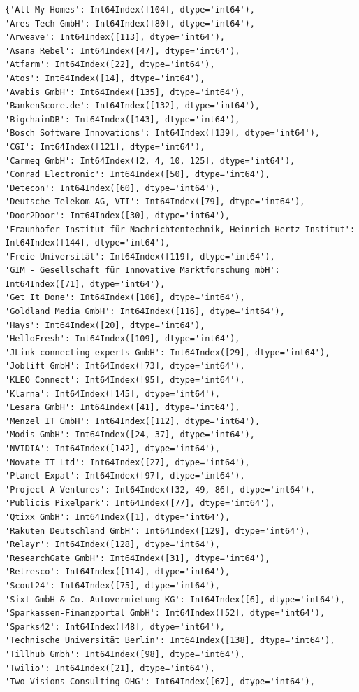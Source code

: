 \documentclass[11pt]{article}
\begin{document}
\begin{enumerate}
\begin{enumerate}
\begin{verbatim}
{'All My Homes': Int64Index([104], dtype='int64'),
'Ares Tech GmbH': Int64Index([80], dtype='int64'),
'Arweave': Int64Index([113], dtype='int64'),
'Asana Rebel': Int64Index([47], dtype='int64'),
'Atfarm': Int64Index([22], dtype='int64'),
'Atos': Int64Index([14], dtype='int64'),
'Avabis GmbH': Int64Index([135], dtype='int64'),
'BankenScore.de': Int64Index([132], dtype='int64'),
'BigchainDB': Int64Index([143], dtype='int64'),
'Bosch Software Innovations': Int64Index([139], dtype='int64'),
'CGI': Int64Index([121], dtype='int64'),
'Carmeq GmbH': Int64Index([2, 4, 10, 125], dtype='int64'),
'Conrad Electronic': Int64Index([50], dtype='int64'),
'Detecon': Int64Index([60], dtype='int64'),
'Deutsche Telekom AG, VTI': Int64Index([79], dtype='int64'),
'Door2Door': Int64Index([30], dtype='int64'),
'Fraunhofer-Institut für Nachrichtentechnik, Heinrich-Hertz-Institut': Int64Index([144], dtype='int64'),
'Freie Universität': Int64Index([119], dtype='int64'),
'GIM - Gesellschaft für Innovative Marktforschung mbH': Int64Index([71], dtype='int64'),
'Get It Done': Int64Index([106], dtype='int64'),
'Goldland Media GmbH': Int64Index([116], dtype='int64'),
'Hays': Int64Index([20], dtype='int64'),
'HelloFresh': Int64Index([109], dtype='int64'),
'JLink connecting experts GmbH': Int64Index([29], dtype='int64'),
'Joblift GmbH': Int64Index([73], dtype='int64'),
'KLEO Connect': Int64Index([95], dtype='int64'),
'Klarna': Int64Index([145], dtype='int64'),
'Lesara GmbH': Int64Index([41], dtype='int64'),
'Menzel IT GmbH': Int64Index([112], dtype='int64'),
'Modis GmbH': Int64Index([24, 37], dtype='int64'),
'NVIDIA': Int64Index([142], dtype='int64'),
'Novate IT Ltd': Int64Index([27], dtype='int64'),
'Planet Expat': Int64Index([97], dtype='int64'),
'Project A Ventures': Int64Index([32, 49, 86], dtype='int64'),
'Publicis Pixelpark': Int64Index([77], dtype='int64'),
'Qtixx GmbH': Int64Index([1], dtype='int64'),
'Rakuten Deutschland GmbH': Int64Index([129], dtype='int64'),
'Relayr': Int64Index([128], dtype='int64'),
'ResearchGate GmbH': Int64Index([31], dtype='int64'),
'Retresco': Int64Index([114], dtype='int64'),
'Scout24': Int64Index([75], dtype='int64'),
'Sixt GmbH & Co. Autovermietung KG': Int64Index([6], dtype='int64'),
'Sparkassen-Finanzportal GmbH': Int64Index([52], dtype='int64'),
'Sparks42': Int64Index([48], dtype='int64'),
'Technische Universität Berlin': Int64Index([138], dtype='int64'),
'Tillhub Gmbh': Int64Index([98], dtype='int64'),
'Twilio': Int64Index([21], dtype='int64'),
'Two Visions Consulting OHG': Int64Index([67], dtype='int64'),

\end{verbatim}
\end{enumerate}
\end{enumerate}
\end{document}
